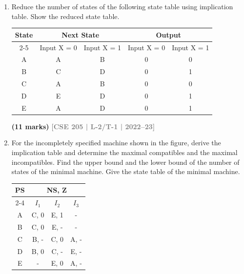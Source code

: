 \documentclass[12pt,a3paper]{article}
\newcommand{\yr}[1]{\hfill\textcolor{gray}{\small\textbf{[#1]}}}
\newcommand{\mk}[1]{\textcolor{orange!70!black}{\small\textbf{(#1 marks)}}}
\begin{document}
\begin{enumerate}
\mk{23} \yr{CSE 205 | L-2/T-1 | 2023--24}

\item Reduce the number of states of the following state table using implication table. Show the reduced state table.

\begin{center}
  \begin{tabular}{|c|c|c|c|c|}
\hline
\multirow{2}{*}{State} & \multicolumn{2}{c|}{Next State} & \multicolumn{2}{c|}{Output} \\ \cline{2-5} 
                       & Input X = 0    & Input X = 1    & Input X = 0  & Input X = 1  \\ \hline
A                      & A              & B              & 0            & 0            \\ \hline
B                      & C              & D              & 0            & 1            \\ \hline
C                      & A              & B              & 0            & 0            \\ \hline
D                      & E              & D              & 0            & 1            \\ \hline
E                      & A              & D              & 0            & 1            \\ \hline
\end{tabular}
\end{center}

\mk{11} \yr{CSE 205 | L-2/T-1 | 2022--23}

\item For the incompletely specified machine shown in the figure, derive the implication table and determine the maximal compatibles and the maximal incompatibles. Find the upper bound and the lower bound of the number of states of the minimal machine. Give the state table of the minimal machine.

\begin{center}
  \begin{tabular}{|c|c|c|c|}
\hline
\multirow{2}{*}{PS} & \multicolumn{3}{c|}{NS, Z} \\ \cline{2-4} 
                    & $I_1$   & $I_2$   & $I_3$   \\ \hline
A                   & C, 0    & E, 1    & -       \\ \hline
B                   & C, 0    & E, -    & -       \\ \hline
C                   & B, -    & C, 0    & A, -    \\ \hline
D                   & B, 0    & C, -    & E, -    \\ \hline
E                   & -       & E, 0    & A, -    \\ \hline
\end{tabular}
\end{center}


\end{enumerate}
\end{document}
